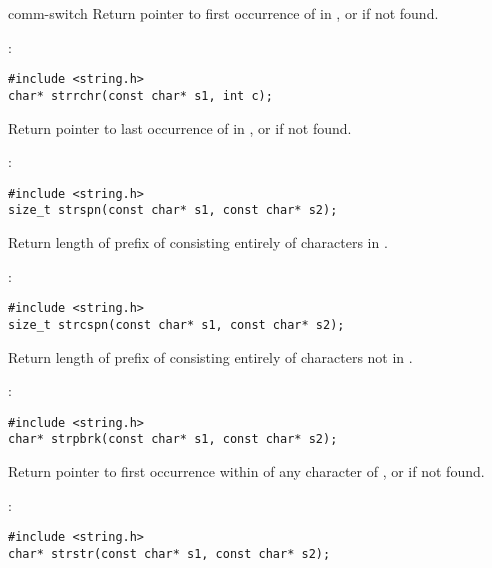\begin{Ventry2}{comm-switch  }
     Return pointer to first occurrence of  in , or
      if not found.

\item[strrchr]
\label{item:strrchr}
:
\begin{production}
\begin{verbatim}
#include <string.h>
char* strrchr(const char* s1, int c);
\end{verbatim}
\end{production}

     Return pointer to last occurrence of  in , or  if not found.

\item[strspn]
\label{item:strspn}
:
\begin{production}
\begin{verbatim}
#include <string.h>
size_t strspn(const char* s1, const char* s2);
\end{verbatim}
\end{production}

     Return length of prefix of  consisting entirely of characters in .

\item[strcspn]
\label{item:strcspn}
:
\begin{production}
\begin{verbatim}
#include <string.h>
size_t strcspn(const char* s1, const char* s2);
\end{verbatim}
\end{production}

     Return length of prefix of  consisting entirely of
     characters not in .

\item[strpbrk]
\label{item:strpbrk}
:
\begin{production}
\begin{verbatim}
#include <string.h>
char* strpbrk(const char* s1, const char* s2);
\end{verbatim}
\end{production}

     Return pointer to first occurrence within  of any character of , or
      if not found.

\item[strstr]
\label{item:strstr}
:
\begin{production}
\begin{verbatim}
#include <string.h>
char* strstr(const char* s1, const char* s2);
\end{verbatim}
\end{production}


\end{Ventry2}
